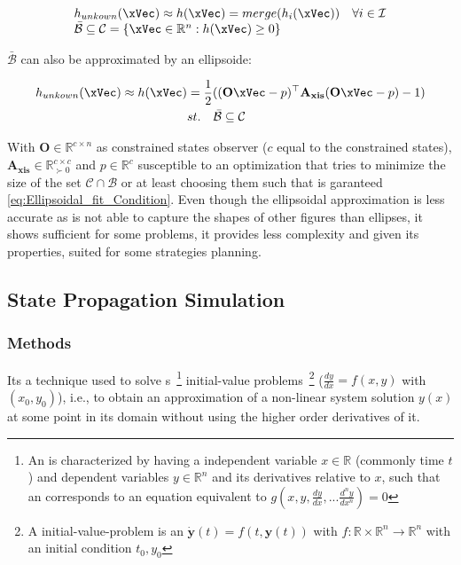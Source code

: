 \begin{equation}
    \begin{array}{l}
        h_{unkown}(\xVec) \approx h(\xVec) = merge(h_i(\xVec)) \quad \forall i \in \mathcal{I} \\
        \bar{\mathcal{B}} \subseteq \mathcal{C} = \{\xVec \in \mathbb{R}^n: h(\xVec) \geq 0\}
    \end{array}
    \label{eq:Polytope_fit}
\end{equation}

\(\bar{\mathcal{B}}\) can also be approximated by an ellipsoide:

\begin{align}
        h_{unkown}(\xVec) \approx h(\xVec) &= \frac{1}{2}((\mathbf{O}\xVec - p)^{\top}\mathbf{A_{xis}}(\mathbf{O}\xVec - p) - 1) \label{eq:Ellipsoidal_fit} \\
        &st. \quad \bar{\mathcal{B}} \subseteq \mathcal{C} \label{eq:Ellipsoidal_fit_Condition}
\end{align}

With \(\mathbf{O} \in \mathbb{R}^{c \times n}\) as constrained states observer (\(c\) equal to the constrained states), \(\mathbf{A_{xis}} \in \mathbb{R}^{c \times c}_{\succ 0}\) and \(p \in \mathbb{R}^{c}\) susceptible to an optimization that tries to minimize the size of the set \(\mathcal{C} \cap \mathcal{B}\) or at least choosing them such that is garanteed \ref{eq:Ellipsoidal_fit_Condition}. Even though the ellipsoidal approximation is less accurate as is not able to capture the shapes of other figures than ellipses, it shows sufficient for some problems, it provides less complexity and given its properties, suited for some strategies planning. \\


\subsection{State Propagation Simulation}
\label{subsub:State_Propagation_Simulation_Algorithm}

\subsubsection{ Methods}
\label{subsub:Runge-Kutta_Methods}

Its a technique used to solve s~\footnote{An  is characterized by having a independent variable \(x \in \mathbb{R}\) (commonly time \(t\)) and dependent variables \(y \in \mathbb{R}^n\) and its derivatives relative to \(x\), such that an  corresponds to an equation equivalent to \(g(x,y, \frac{dy}{dx}, ... \frac{d^{n}y}{dx^n})= 0\)  } initial-value problems~\footnote{A initial-value-problem is an  \(\dot{\mathbf{y}}(t) = f(t, \mathbf{y}(t))\) with \( f: \mathbb{R} \times \mathbb{R}^n \to \mathbb{R}^n\) with an initial condition \(t_0,y_0\)} (\(\frac{dy}{dx} = f(x,y)\) with \((x_0, y_0)\)), i.e., to obtain an approximation of a non-linear system solution \(y(x)\) at some point in its domain without using the higher order derivatives of it. \\

